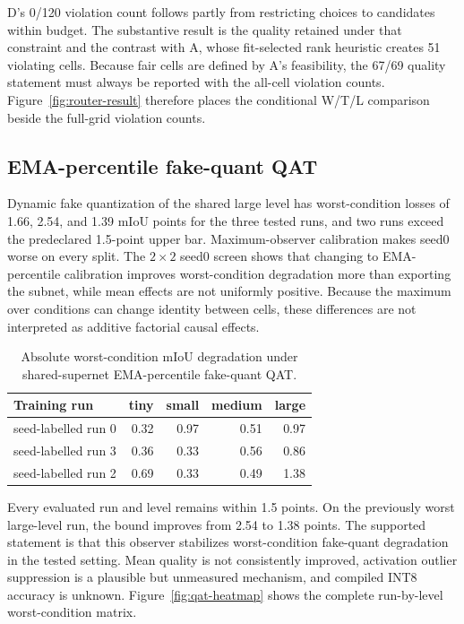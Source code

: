 \documentclass[a4paper,review,12pt]{elsarticle}
\newcommand{\miou}{mIoU}
\begin{document}
D's 0/120 violation count follows partly from restricting choices to candidates within budget. The substantive result is the quality retained under that constraint and the contrast with A, whose fit-selected rank heuristic creates 51 violating cells. Because fair cells are defined by A's feasibility, the 67/69 quality statement must always be reported with the all-cell violation counts. Figure~\ref{fig:router-result} therefore places the conditional W/T/L comparison beside the full-grid violation counts.



\subsection{EMA-percentile fake-quant QAT}
\label{sec:qatresults}

Dynamic fake quantization of the shared large level has worst-condition losses of 1.66, 2.54, and 1.39 \miou{} points for the three tested runs, and two runs exceed the predeclared 1.5-point upper bar. Maximum-observer calibration makes seed0 worse on every split. The $2\times2$ seed0 screen shows that changing to EMA-percentile calibration improves worst-condition degradation more than exporting the subnet, while mean effects are not uniformly positive. Because the maximum over conditions can change identity between cells, these differences are not interpreted as additive factorial causal effects.

\begin{table}[t]
\centering
\caption{Absolute worst-condition \miou{} degradation under shared-supernet EMA-percentile fake-quant QAT.}
\label{tab:qat}
\begin{tabular}{@{}lrrrr@{}}
\toprule
Training run & tiny & small & medium & large \\
\midrule
seed-labelled run 0 & 0.32 & 0.97 & 0.51 & 0.97 \\
seed-labelled run 3 & 0.36 & 0.33 & 0.56 & 0.86 \\
seed-labelled run 2 & 0.69 & 0.33 & 0.49 & 1.38 \\
\bottomrule
\end{tabular}
\end{table}

Every evaluated run and level remains within 1.5 points. On the previously worst large-level run, the bound improves from 2.54 to 1.38 points. The supported statement is that this observer stabilizes worst-condition fake-quant degradation in the tested setting. Mean quality is not consistently improved, activation outlier suppression is a plausible but unmeasured mechanism, and compiled INT8 accuracy is unknown. Figure~\ref{fig:qat-heatmap} shows the complete run-by-level worst-condition matrix.
\end{document}
